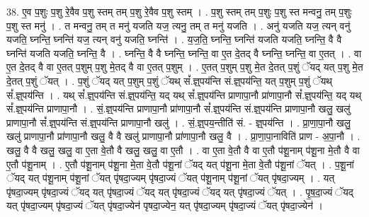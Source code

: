\documentclass[17pt]{extarticle}
\begin{document}
38. ए॒व प॒शुः प॒शु रे॒वैव प॒शु स्तम् तम् प॒शु रे॒वैव प॒शु स्तम् । . प॒शु स्तम् तम् प॒शुः प॒शु स्त मन्वनु॒ तम् प॒शुः प॒शु स्त मनु॑ । . त मन्वनु॒ तम् त मनु॑ यजति यज॒ त्यनु॒ तम् त मनु॑ यजति । . अनु॑ यजति यज॒ त्यन् वनु॑ यजति॒ घ्नन्ति॒ घ्नन्ति॑ यज॒ त्यन् वनु॑ यजति॒ घ्नन्ति॑ । . य॒ज॒ति॒ घ्नन्ति॒ घ्नन्ति॑ यजति यजति॒ घ्नन्ति॒ वै वै घ्नन्ति॑ यजति यजति॒ घ्नन्ति॒ वै । . घ्नन्ति॒ वै वै घ्नन्ति॒ घ्नन्ति॒ वा ए॒त दे॒तद् वै घ्नन्ति॒ घ्नन्ति॒ वा ए॒तत् । . वा ए॒त दे॒तद् वै वा ए॒तत् प॒शुम् प॒शु मे॒तद् वै वा ए॒तत् प॒शुम् । . ए॒तत् प॒शुम् प॒शु मे॒त दे॒तत् प॒शुं ॅयद् यत् प॒शु मे॒त दे॒तत् प॒शुं ॅयत् । . प॒शुं ॅयद् यत् प॒शुम् प॒शुं ॅयथ् सं᳚.ज्ञ्॒पय॑न्ति सं.ज्ञ्॒पय॑न्ति॒ यत् प॒शुम् प॒शुं ॅयथ् 
सं᳚.ज्ञ्॒पय॑न्ति । . यथ् सं᳚.ज्ञ्॒पय॑न्ति सं.ज्ञ्॒पय॑न्ति॒ यद् यथ् सं᳚.ज्ञ्॒पय॑न्ति प्राणापा॒नौ प्रा॑णापा॒नौ सं᳚.ज्ञ्॒पय॑न्ति॒ यद् यथ् सं᳚.ज्ञ्॒पय॑न्ति प्राणापा॒नौ । . सं॒.ज्ञ्॒पय॑न्ति प्राणापा॒नौ प्रा॑णापा॒नौ सं᳚.ज्ञ्॒पय॑न्ति सं.ज्ञ्॒पय॑न्ति प्राणापा॒नौ खलु॒ खलु॑ प्राणापा॒नौ सं᳚.ज्ञ्॒पय॑न्ति सं.ज्ञ्॒पय॑न्ति प्राणापा॒नौ खलु॑ । . सं॒.ज्ञ्॒पय॒न्तीति॑ सं. - ज्ञ्॒पय॑न्ति । . प्रा॒णा॒पा॒नौ खलु॒ खलु॑ प्राणापा॒नौ प्रा॑णापा॒नौ खलु॒ वै वै खलु॑ प्राणापा॒नौ प्रा॑णापा॒नौ खलु॒ वै । . प्रा॒णा॒पा॒नाविति॑ प्राण - अ॒पा॒नौ । . खलु॒ वै वै खलु॒ खलु॒ वा ए॒ता वे॒तौ वै खलु॒ खलु॒ वा ए॒तौ । . वा ए॒ता वे॒तौ वै वा ए॒तौ प॑शू॒नाम् प॑शू॒ना मे॒तौ वै वा ए॒तौ प॑शू॒नाम् । . ए॒तौ प॑शू॒नाम् प॑शू॒ना मे॒ता वे॒तौ प॑शू॒नां ॅयद् यत् प॑शू॒ना मे॒ता वे॒तौ प॑शू॒नां ॅयत् । . प॒शू॒नां ॅयद् यत् प॑शू॒नाम् प॑शू॒नां ॅयत् पृ॑षदा॒ज्यम् पृ॑षदा॒ज्यं ॅयत् प॑शू॒नाम् प॑शू॒नां ॅयत् पृ॑षदा॒ज्यम् । . यत् पृ॑षदा॒ज्यम् पृ॑षदा॒ज्यं ॅयद् यत् पृ॑षदा॒ज्यं ॅयद् यत् पृ॑षदा॒ज्यं ॅयद् यत् पृ॑षदा॒ज्यं ॅयत् । . पृ॒ष॒दा॒ज्यं ॅयद् यत् पृ॑षदा॒ज्यम् पृ॑षदा॒ज्यं ॅयत् पृ॑षदा॒ज्येन॑ पृषदा॒ज्येन॒ यत् पृ॑षदा॒ज्यम् पृ॑षदा॒ज्यं ॅयत् पृ॑षदा॒ज्येन॑ । \newline
\end{document}
